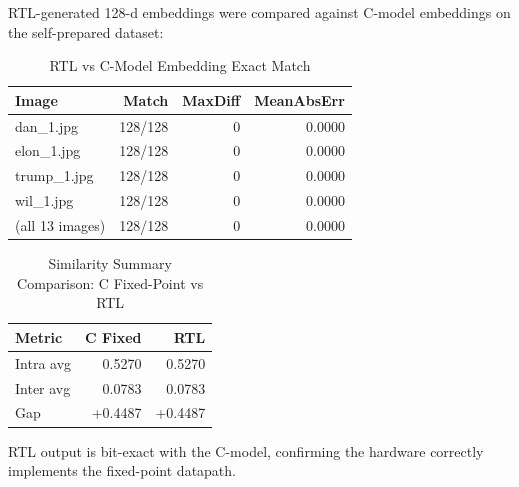 RTL-generated 128-d embeddings were compared against C-model embeddings on the self-prepared dataset:
 
\begin{table}[H]
\centering
\caption{RTL vs C-Model Embedding Exact Match}
\begin{tabular}{lrrr}
\toprule
\textbf{Image} & \textbf{Match} & \textbf{MaxDiff} & \textbf{MeanAbsErr} \\
\midrule
dan\_1.jpg    & 128/128 & 0 & 0.0000 \\
elon\_1.jpg   & 128/128 & 0 & 0.0000 \\
trump\_1.jpg  & 128/128 & 0 & 0.0000 \\
wil\_1.jpg    & 128/128 & 0 & 0.0000 \\
(all 13 images) & 128/128 & 0 & 0.0000 \\
\bottomrule
\end{tabular}
\end{table}
 
\begin{table}[H]
\centering
\caption{Similarity Summary Comparison: C Fixed-Point vs RTL}
\begin{tabular}{lrr}
\toprule
\textbf{Metric} & \textbf{C Fixed} & \textbf{RTL} \\
\midrule
Intra avg & 0.5270 & 0.5270 \\
Inter avg & 0.0783 & 0.0783 \\
Gap       & +0.4487 & +0.4487 \\
\bottomrule
\end{tabular}
\end{table}
 
RTL output is bit-exact with the C-model, confirming the hardware correctly implements the fixed-point datapath.